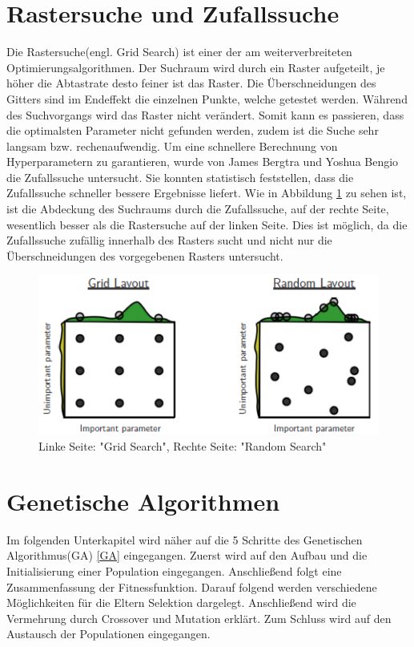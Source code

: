 \section{Rastersuche und Zufallssuche} \label{Zufalls_Suche}
Die Rastersuche(engl. Grid Search) ist einer der am weiterverbreiteten Optimierungsalgorithmen. Der Suchraum wird durch ein Raster aufgeteilt, je höher die Abtastrate desto feiner ist das Raster. Die Überschneidungen des Gitters sind im Endeffekt die einzelnen Punkte, welche getestet werden. Während des Suchvorgangs wird das Raster nicht verändert. Somit kann es passieren, dass die optimalsten Parameter nicht gefunden werden, zudem ist die Suche sehr langsam bzw. rechenaufwendig. Um eine schnellere Berechnung von Hyperparametern zu garantieren, wurde von James Bergtra und Yoshua Bengio die Zufallssuche untersucht. Sie konnten statistisch feststellen, dass die Zufallssuche schneller bessere Ergebnisse liefert. \cite{bergstra2012random} Wie in Abbildung \ref{fig:RandomSearch} zu sehen ist, ist die Abdeckung des Suchraums durch die Zufallssuche, auf der rechte Seite, wesentlich besser als die Rastersuche auf der linken Seite. Dies ist möglich, da die Zufallssuche zufällig innerhalb des Rasters sucht und nicht nur die Überschneidungen des vorgegebenen Rasters untersucht.

\noindent%
\begin{figure}
  \centering  
  \includegraphics[scale=0.9]{img/gridsearch.png}
  \caption{Linke Seite: "Grid Search", Rechte Seite: "Random Search" \cite{bergstra2012random}}
  \label{fig:RandomSearch}
\end{figure}

\section{Genetische Algorithmen} \label{Genetische_Algorithmen}
Im folgenden Unterkapitel wird näher auf die 5 Schritte des Genetischen Algorithmus(GA) \ref{GA} eingegangen. Zuerst wird auf den Aufbau und die Initialisierung einer Population eingegangen. Anschließend folgt eine Zusammenfassung der Fitnessfunktion. Darauf folgend werden verschiedene Möglichkeiten für die Eltern Selektion dargelegt. Anschließend wird die Vermehrung durch Crossover und Mutation erklärt. Zum Schluss wird auf den Austausch der Populationen eingegangen. 

